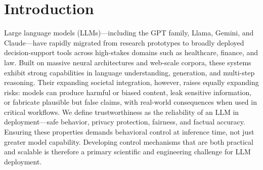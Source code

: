 
\section{Introduction}
\label{sec:intro}

Large language models (LLMs)—including the GPT family, Llama, Gemini, and Claude—have rapidly migrated from research prototypes to broadly deployed decision-support tools across high-stakes domains such as healthcare, finance, and law. Built on massive neural architectures and web-scale corpora, these systems exhibit strong capabilities in language understanding, generation, and multi-step reasoning. Their expanding societal integration, however, raises equally expanding risks: models can produce harmful or biased content, leak sensitive information, or fabricate plausible but false claims, with real-world consequences when used in critical workflows. We define trustworthiness as the reliability of an LLM in deployment—safe behavior, privacy protection, fairness, and factual accuracy. Ensuring these properties demands behavioral control at inference time, not just greater model capability. Developing control mechanisms that are both practical and scalable is therefore a primary scientific and engineering challenge for LLM deployment.


